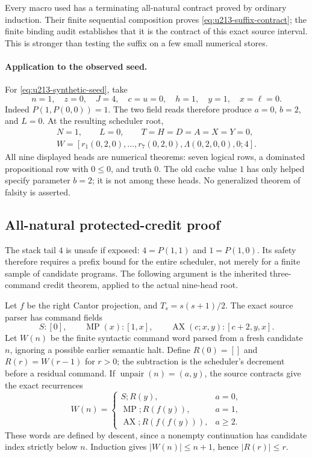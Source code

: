 Every macro used has a terminating all-natural contract proved by
ordinary induction.  Their finite sequential composition proves
\eqref{eq:u213-suffix-contract}; the finite binding audit establishes
that it is the contract of this exact source interval.  This is stronger
than testing the suffix on a few small numerical stores.

\paragraph{Application to the observed seed.}
For \eqref{eq:u213-synthetic-seed}, take
\[
 n=1,\quad z=0,\quad J=4,\quad c=u=0,\quad h=1,
 \quad y=1,\quad x=\ell=0.
\]
Indeed $P(1,P(0,0))=1$.  The two field reads therefore produce
$a=0$, $b=2$, and $L=0$.  At the resulting scheduler root,
\begin{equation}
 \begin{gathered}
 N=1,\qquad L=0,\qquad T=H=D=A=X=Y=0,\\
 W=[r_1(0,2,0),\ldots,r_7(0,2,0),\Lambda(0,2,0,0),0;4].
 \label{eq:u213-safe-root}
 \end{gathered}
\end{equation}
All nine displayed heads are numerical theorems: seven logical rows,
a dominated propositional row with $0\leq0$, and truth $0$.
The old cache value $1$ has only helped specify parameter $b=2$; it is
not among these heads.  No generalized theorem of falsity is asserted.

\subsection{All-natural protected-credit proof}

The stack tail $4$ is unsafe if exposed: $4=P(1,1)$ and $1=P(1,0)$.
Its safety therefore requires a prefix bound for the entire scheduler,
not merely for a finite sample of candidate programs.  The following
argument is the inherited three-command credit theorem, applied to the
actual nine-head root.

Let $f$ be the right Cantor projection, and
$T_s=s(s+1)/2$.  The exact source parser has command fields
\[
 S:[0],\qquad \operatorname{MP}(x):[1,x],\qquad
 \operatorname{AX}(c;x,y):[c+2,y,x].
\]
Let $W(n)$ be the finite syntactic command word parsed from a fresh
candidate $n$, ignoring a possible earlier semantic halt.  Define
$R(0)=[]$ and $R(r)=W(r-1)$ for $r>0$; the subtraction is the scheduler's
decrement before a residual command.  If $\operatorname{unpair}(n)=(a,y)$,
the source contracts give the exact recurrences
\[
 W(n)=\begin{cases}
 S;R(y),&a=0,\\
 \operatorname{MP};R(f(y)),&a=1,\\
 \operatorname{AX};R(f(f(y))),&a\geq2.
 \end{cases}
\]
These words are defined by descent, since a nonempty continuation has
candidate index strictly below $n$.  Induction gives $|W(n)|\leq n+1$,
hence $|R(r)|\leq r$.

